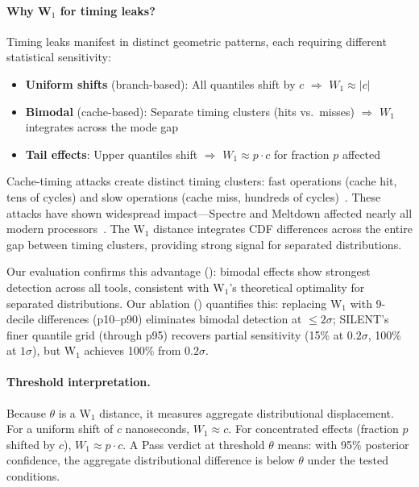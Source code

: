 \documentclass[letterpaper,twocolumn,10pt]{article}
\newcommand{\silent}{\textsc{SILENT}\xspace}
\begin{document}
\paragraph{Why W$_1$ for timing leaks?}
Timing leaks manifest in distinct geometric patterns, each requiring different
statistical sensitivity:
\begin{itemize}
    \item \textbf{Uniform shifts} (branch-based): All quantiles shift by $c$ $\Rightarrow$ $W_1 \approx |c|$
    \item \textbf{Bimodal} (cache-based): Separate timing clusters (hits vs.\ misses) $\Rightarrow$ $W_1$ integrates across the mode gap
    \item \textbf{Tail effects}: Upper quantiles shift $\Rightarrow$ $W_1 \approx p \cdot c$ for fraction $p$ affected
\end{itemize}

Cache-timing attacks create distinct timing clusters: fast operations (cache hit,
tens of cycles) and slow operations (cache miss, hundreds of
cycles)~\cite{bernstein2005cache,flushreload}. These attacks have shown widespread
impact---Spectre and Meltdown affected nearly all modern processors~\cite{meltdown,spectre}.
The W$_1$ distance integrates CDF differences across the entire gap between timing
clusters, providing strong signal for separated distributions.

Our evaluation confirms this advantage (): bimodal effects
show strongest detection across all tools, consistent with W$_1$'s
theoretical optimality for separated distributions. Our ablation
() quantifies this: replacing W$_1$ with 9-decile
differences (p10--p90) eliminates bimodal detection at $\leq 2\sigma$; \silent's
finer quantile grid (through p95) recovers partial sensitivity (15\% at $0.2\sigma$,
100\% at $1\sigma$), but W$_1$ achieves 100\% from $0.2\sigma$.

\paragraph{Threshold interpretation.}
Because $\theta$ is a W$_1$ distance, it measures aggregate distributional displacement.
For a uniform shift of $c$ nanoseconds, $W_1 \approx c$. For concentrated effects
(fraction $p$ shifted by $c$), $W_1 \approx p \cdot c$.
A Pass verdict at threshold $\theta$ means: with 95\% posterior confidence, the
aggregate distributional difference is below $\theta$ under the tested conditions.
\end{document}
